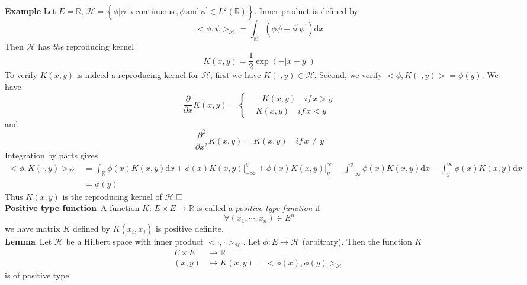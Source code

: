 \documentclass[a4paper,onecolumn]{article}
\begin{document}
\noindent \textbf{Example} \quad Let $E = \mathbb{R}$, $\mathcal{H} = \left\{\phi\big| \phi\, \textrm{is continuous}\,, \phi 
\,\textrm{and}\, \phi^\prime \in L^2(\mathbb{R})\right\}$. Inner product is defined by
$$
    <\phi,\psi>_\mathcal{H} = \int_\mathbb{R}
    \left( \phi\psi + \phi^\prime \psi^\prime\right) \textrm{d}x
$$
Then $\mathcal{H}$ has \emph{the} reproducing kernel
$$
    K(x,y) = \frac{1}{2} \exp(-|x-y|)
$$ 
To verify $K(x,y)$ is indeed a reproducing kernel for $\mathcal{H}$, first we have $K(\cdot, y)\in \mathcal{H}$. Second, we
verify $<\phi, K(\cdot, y)> = \phi(y)$.
We have
\begin{equation*}
\frac{\partial}{\partial x}K(x,y)=\left\{
\begin{split}
& -K(x,y)\quad if \, x>y\\
& K(x,y)\quad if \, x<y
\end{split}
\right.
\end{equation*}
and 
$$
    \frac{\partial^2}{\partial x^2} K(x,y)  = K(x,y)\quad if \, x\neq y
$$
Integration by parts gives
\begin{equation*}\begin{split}
    <\phi, K(\cdot, y)>_\mathcal{H} &= \int_\mathbb{R}\phi(x) K(x, y)\textrm{d}x
    + \phi(x) K(x,y)\big|^y_{-\infty} + \phi(x) K(x,y) \big|^{\infty}_{y}
    - \int_{-\infty}^y \phi(x)K(x,y)\textrm{d}x - \int_{y}^{\infty} \phi(x)K(x,y)\textrm{d}x\\
    & = \phi(y)
\end{split}\end{equation*}
Thus $K(x,y)$ is the reproducing kernel of $\mathcal{H}$.$\hfill\Box$\\

\noindent \textbf{Positive type function}$\,$ A function $K$: $E\times E\rightarrow \mathbb{R}$ is called
a \emph{positive type function} if 
$$
    \forall (x_1, \cdots, x_n) \in E^n
$$
we have matrix $K$ defined by $K(x_i, x_j)$ is positive definite.\\

\noindent \textbf{Lemma}$\,$ Let $\mathcal{H}$ be a Hilbert space with inner product $<\cdot, \cdot>_{\mathcal{H}}$.
Let $\phi: E\rightarrow\mathcal{H}$ (arbitrary). Then the function $K$
\begin{equation*}\begin{split}
    E\times E&\rightarrow \mathbb{R}\\
    (x,y) &\mapsto K(x,y)=<\phi(x),\phi(y)>_{\mathcal{H}}
\end{split}\end{equation*}
is of positive type.\\
\end{document}
